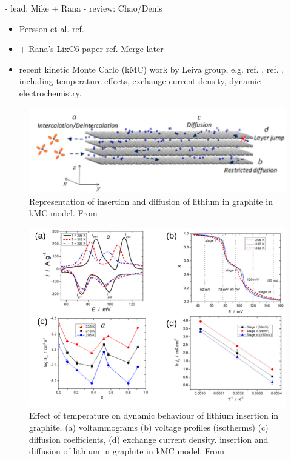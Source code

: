 \documentclass[journal=jacsat,manuscript=article]{achemso}
\begin{document}
- lead: Mike + Rana
- review: Chao/Denis

\begin{itemize}
    \item Persson et al. ref. 
    \item + Rana's LixC6 paper ref.  Merge later
    \item recent kinetic Monte Carlo (kMC) work by Leiva group, e.g. ref. , ref. , including temperature effects, exchange current density, dynamic electrochemistry.
\end{itemize}

    \begin{figure}
    \centering
    \includegraphics[scale=2]{figures/kmc_scheme.png}
    \caption{Representation of insertion and diffusion of lithium in graphite in kMC model.  From }
    \label{fig:graphite_kmcscheme}
\end{figure}

    \begin{figure}
    \centering
    \includegraphics[scale=2]{figures/kmc_observables.png}
    \caption{Effect of temperature on dynamic behaviour of lithium insertion in graphite. (a) voltammograms (b) voltage profiles (isotherms) (c) diffusion coefficients, (d) exchange current density. insertion and diffusion of lithium in graphite in kMC model.  From }
    \label{fig:graphite_kmcobservables}
\end{figure}
\end{document}
